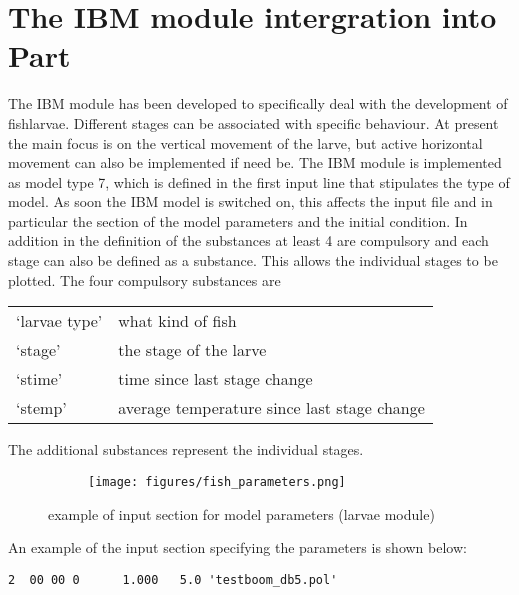 \documentclass[english]{deltares_manual}
\begin{document}
\section{The IBM module intergration into Part}
The IBM module has been developed to specifically deal with the development of fishlarvae. Different stages can be associated with specific behaviour. At present the main focus is on the vertical movement of the larve, but active horizontal movement can also be implemented if need be. 
The IBM module is implemented as model type 7, which is defined in the first input line that stipulates the type of model. As soon the IBM model is switched on, this affects the input file and in particular the section of the model parameters and the initial condition. In addition in the definition of the substances at least 4 are compulsory and each stage can also be defined as a substance. This allows the individual stages to be plotted. The four compulsory substances are 
\begin{table}[h!]
	\begin{tabular}{ll} 
	‘larvae type’ & what kind of fish \\
	‘stage’	& the stage of the larve\\
	‘stime’ &  time since last stage change\\
	‘stemp’&	average temperature since last stage change\\
	\end{tabular}	
\end{table}

The additional substances represent the individual stages. 
\begin{figure}[H]%
\begin{tcolorbox}[interior hidden, 
	boxsep=0pt,
	left=0pt,
	right=0pt,
	top=0pt,]
	\begin{subfigure}{1.0\textwidth}
		\texttt{[image: figures/fish\_parameters.png]}%
	\end{subfigure}
\end{tcolorbox}
	\caption{example of input section for model parameters (larvae module)}
	\label{fig:larvae_parameters}
\end{figure}


An example of the input section specifying the parameters is shown below:

\begin{tcolorbox}
	\begin{verbatim}
2  00 00 0		1.000	5.0	'testboom_db5.pol' 
	\end{verbatim}
\end{tcolorbox}
\end{document}
